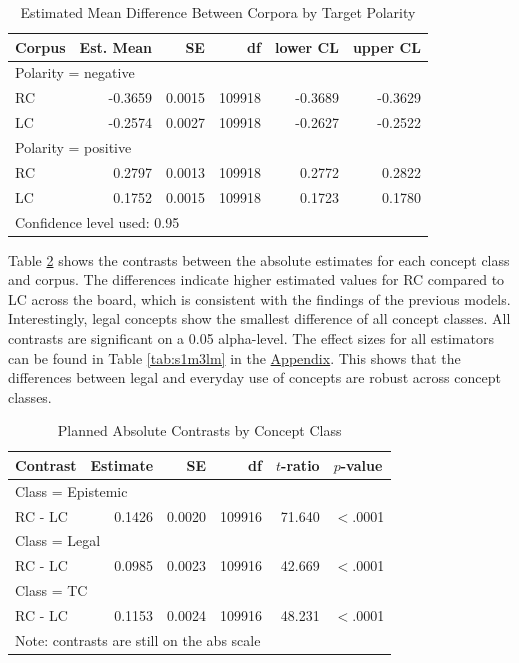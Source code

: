 \documentclass{article}
\begin{document}
\begin{table}[!h]
\centering
\begin{tabular}{lrrrrr}
  \hline
Corpus & Est. Mean & SE & df & lower CL & upper CL \\ 
\hline
\multicolumn{6}{l}{Polarity = negative}\\
\cmidrule{1-2}
RC & -0.3659 & 0.0015 & 109918 & -0.3689 & -0.3629 \\ 
  LC & -0.2574 & 0.0027 & 109918 & -0.2627 & -0.2522 \\ 
   \cmidrule{1-6}
\multicolumn{6}{l}{Polarity = positive}\\
\cmidrule{1-2}
RC & 0.2797 & 0.0013 & 109918 & 0.2772 & 0.2822 \\ 
  LC & 0.1752 & 0.0015 & 109918 & 0.1723 & 0.1780 \\ 
   \hline
\multicolumn{6}{l}{{\footnotesize Confidence level used: 0.95}}\\
\end{tabular}
\caption{Estimated Mean Difference Between Corpora by Target Polarity}
\label{tab:s1m2}
\end{table}

Table \ref{tab:s1m3} shows the contrasts between the absolute estimates for each concept class and corpus. The differences indicate higher estimated values for RC compared to LC across the board, which is consistent with the findings of the previous models. Interestingly, legal concepts show the smallest difference of all concept classes. All contrasts are significant on a 0.05 alpha-level. The effect sizes for all estimators can be found in Table \ref{tab:s1m3lm} in the \hyperref[sec:appendix]{Appendix}. This shows that the differences between legal and everyday use of concepts are robust across concept classes.

\begin{table}[ht]
\centering
\begin{tabular}{lrrrrl}
  \hline
Contrast & Estimate & SE & df & $t$-ratio & $p$-value \\ 
  \hline
\multicolumn{6}{l}{Class = Epistemic}\\
RC - LC & 0.1426 & 0.0020 & 109916 & 71.640 & $<$.0001 \\ 
\cmidrule{1-1}
\multicolumn{6}{l}{Class = Legal}\\
RC - LC & 0.0985 & 0.0023 & 109916 & 42.669 & $<$.0001 \\ 
\cmidrule{1-1}
\multicolumn{6}{l}{Class = TC}\\
RC - LC & 0.1153 & 0.0024 & 109916 & 48.231 & $<$.0001 \\ 
   \hline
\multicolumn{6}{l}{{\footnotesize Note: contrasts are still on the abs scale}}\\
\end{tabular}
\caption{Planned Absolute Contrasts by Concept Class}
\label{tab:s1m3}
\end{table}
\end{document}
